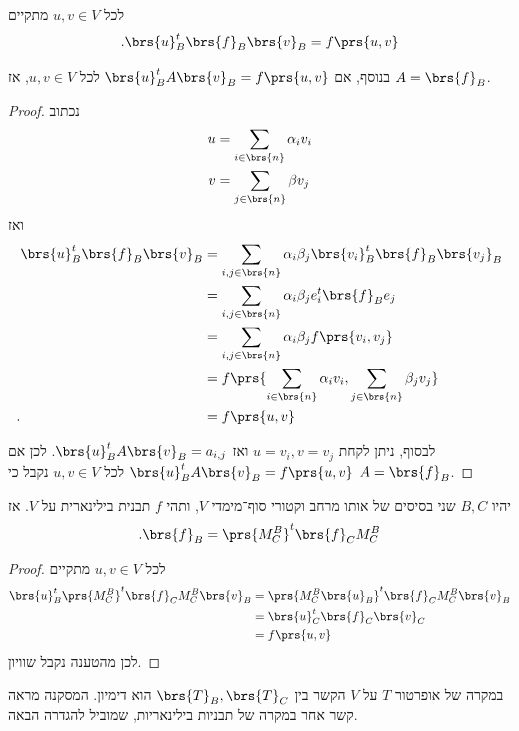 \documentclass[a4paper,10pt,twoside,openany]{book}
\begin{document}
\begin{proposition}
לכל
$u,v \in V$
מתקיים
\[\text{.} \brs{u}_B^t \brs{f}_B \brs{v}_B = f\prs{u,v}\]

בנוסף, אם
$\brs{u}_B^t A \brs{v}_B = f\prs{u,v}$
לכל
$u,v \in V$,
אז
$A = \brs{f}_B$.
\end{proposition}

\begin{proof}
נכתוב
\begin{align*}
u &= \sum_{i \in \brs{n}} \alpha_i v_i \\
v &= \sum_{j \in \brs{n}} \beta v_j
\end{align*}
ואז
\begin{align*}
\brs{u}_B^t \brs{f}_B \brs{v}_B &= \sum_{i,j \in \brs{n}} \alpha_i \beta_j \brs{v_i}_B^t \brs{f}_B \brs{v_j}_B
\\&= \sum_{i,j \in \brs{n}} \alpha_i \beta_j e_i^t \brs{f}_B e_j
\\&= \sum_{i,j \in \brs{n}} \alpha_i \beta_j f\prs{v_i, v_j}
\\&= f\prs{\sum_{i \in \brs{n}} \alpha_i v_i, \sum_{j \in \brs{n}} \beta_j v_j}
\\ \text{.} \hphantom{\brs{u}_B^t \brs{f}_B \brs{v}_B} &= f\prs{u,v}
\end{align*}

לבסוף, ניתן לקחת
$u = v_i, v = v_j$
ואז
$\brs{u}_B^t A \brs{v}_B = a_{i,j}$.
לכן אם
$\brs{u}_B^t A \brs{v}_B = f\prs{u,v}$
לכל
$u,v \in V$
נקבל כי
$A = \brs{f}_B$.
\end{proof}

\begin{corollary}
יהיו
$B,C$
שני בסיסים של אותו מרחב וקטורי סוף־מימדי
$V$,
ותהי
$f$
תבנית בילינארית על
$V$.
אז
\begin{align*}
\text{.} \brs{f}_B = \prs{M^B_C}^t \brs{f}_C M^B_C
\end{align*}
\end{corollary}

\begin{proof}
לכל
$u,v \in V$
מתקיים
\begin{align*}
\brs{u}_B^t \prs{M^B_C}^t \brs{f}_C M^B_C \brs{v}_B &=
\prs{M^B_C \brs{u}_B}^t \brs{f}_C M^B_C \brs{v}_B
\\&= \brs{u}_C^t \brs{f}_C \brs{v}_C
\\&= f\prs{u,v}
\end{align*}
לכן מהטענה נקבל שוויון.
\end{proof}

במקרה של אופרטור
$T$
על
$V$
הקשר בין
$\brs{T}_B, \brs{T}_C$
הוא דימיון. המסקנה מראה קשר אחר במקרה של תבניות בילינאריות, שמוביל להגדרה הבאה.
\end{document}
